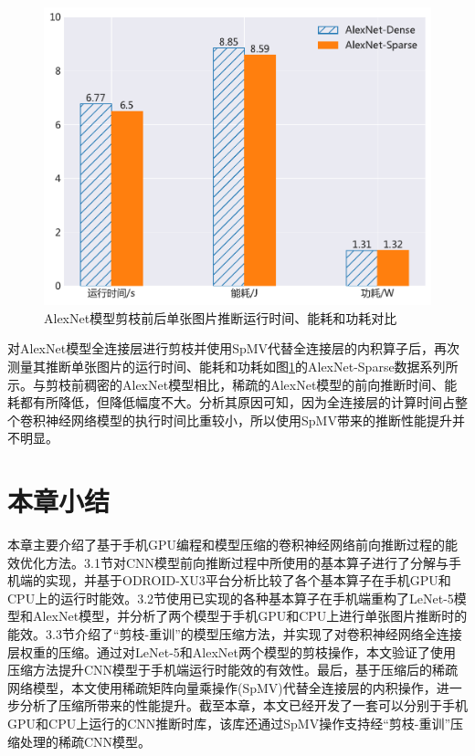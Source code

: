 \begin{figure}[htbp]
    \centering
    \includegraphics[height=0.4\textwidth]{figures/alexnet_sparse.pdf}
    \caption{AlexNet模型剪枝前后单张图片推断运行时间、能耗和功耗对比}\label{figure:figure26}
\end{figure}

对AlexNet模型全连接层进行剪枝并使用SpMV代替全连接层的内积算子后，再次测量其推断单张图片的运行时间、能耗和功耗如图\ref{figure:figure26}的AlexNet-Sparse数据系列所示。与剪枝前稠密的AlexNet模型相比，稀疏的AlexNet模型的前向推断时间、能耗都有所降低，但降低幅度不大。分析其原因可知，因为全连接层的计算时间占整个卷积神经网络模型的执行时间比重较小，所以使用SpMV带来的推断性能提升并不明显。

\section{本章小结}

本章主要介绍了基于手机GPU编程和模型压缩的卷积神经网络前向推断过程的能效优化方法。3.1节对CNN模型前向推断过程中所使用的基本算子进行了分解与手机端的实现，并基于ODROID-XU3平台分析比较了各个基本算子在手机GPU和CPU上的运行时能效。3.2节使用已实现的各种基本算子在手机端重构了LeNet-5模型和AlexNet模型，并分析了两个模型于手机GPU和CPU上进行单张图片推断时的能效。3.3节介绍了“剪枝-重训”的模型压缩方法，并实现了对卷积神经网络全连接层权重的压缩。通过对LeNet-5和AlexNet两个模型的剪枝操作，本文验证了使用压缩方法提升CNN模型于手机端运行时能效的有效性。最后，基于压缩后的稀疏网络模型，本文使用稀疏矩阵向量乘操作(SpMV)代替全连接层的内积操作，进一步分析了压缩所带来的性能提升。截至本章，本文已经开发了一套可以分别于手机GPU和CPU上运行的CNN推断时库，该库还通过SpMV操作支持经“剪枝-重训”压缩处理的稀疏CNN模型。

\cleardoublepage
